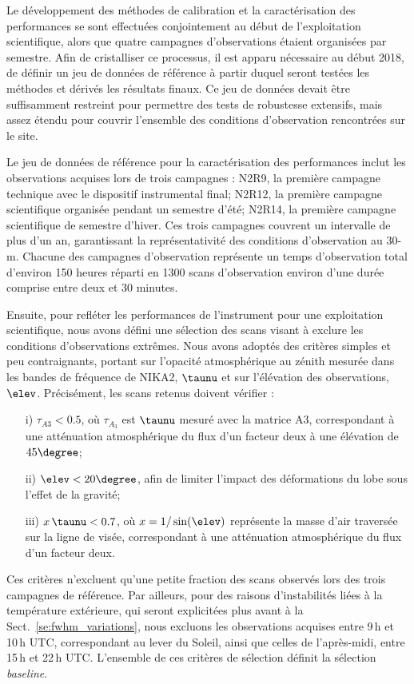 Le développement des méthodes de calibration et la caractérisation
des performances se sont effectuées conjointement au début de
l'exploitation scientifique, alors que quatre campagnes d'observations
étaient organisées par semestre. Afin de cristalliser ce processus, il
est apparu nécessaire au début 2018, de définir un jeu de données de
référence à partir duquel seront testées les méthodes et dérivés les
résultats finaux. Ce jeu de données devait être suffisamment restreint
pour permettre des tests de robustesse extensifs, mais assez étendu
pour couvrir l'ensemble des conditions d'observation rencontrées sur
le site.

Le jeu de données de référence pour la caractérisation des
performances inclut les observations acquises lors de trois campagnes
: N2R9, la première campagne technique avec le dispositif
instrumental final; N2R12, la première campagne scientifique
organisée pendant un semestre d'été; N2R14, la première campagne
scientifique de semestre d'hiver. Ces trois campagnes couvrent un
intervalle de plus d'un an, garantissant la représentativité des
conditions d'observation au 30-m. Chacune des campagnes d'observation
représente un temps d'observation total d'environ 150 heures réparti
en 1300 scans d'observation environ d'une durée comprise entre
deux et 30 minutes.

Ensuite, pour refléter les performances de l'instrument pour une
exploitation scientifique, nous avons défini une sélection des scans
visant à exclure les conditions d'observations extrêmes. Nous avons
adoptés des critères simples et peu contraignants, portant sur l'opacité
atmosphérique au zénith mesurée dans les bandes de fréquence de NIKA2,
$\taunu$ et sur l'élévation des observations, $\elev$. Précisément,
les scans retenus doivent vérifier :
\begin{itemize}
  \item[i)]{$\tau_{A3} < 0.5$, où $\tau_{A_3}$ est $\taunu$ mesuré
    avec la matrice A3, correspondant à une atténuation atmosphérique
    du flux d'un facteur deux à une élévation de $45\degree$;}
  \item[ii)]{$\elev < 20\degree$, afin de limiter l'impact des déformations du lobe
    sous l'effet de la gravité;}
  \item[iii)]{$x\, \taunu < 0.7$, où $x = 1/\sin(\elev)$ représente la
    masse d'air traversée sur la ligne de visée, correspondant à une
    atténuation atmosphérique du flux d'un facteur deux.}
\end{itemize}

Ces critères n'excluent qu'une petite fraction des scans observés lors
des trois campagnes de référence. %
Par ailleurs, pour des raisons d'instabilités liées à la température
extérieure, qui seront explicitées plus avant à la
Sect.~\ref{se:fwhm_variations}, nous excluons les observations
acquises entre 9\,h et 10\,h UTC, correspondant au lever du Soleil,
ainsi que celles de l'après-midi, entre 15\,h et 22\,h UTC. L'ensemble
de ces critères de sélection définit la sélection \emph{baseline}. 

